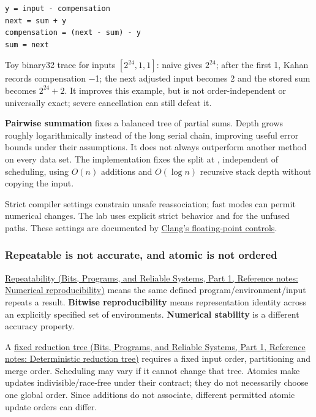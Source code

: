 \begin{verbatim}
y = input - compensation
next = sum + y
compensation = (next - sum) - y
sum = next
\end{verbatim}

Toy binary32 trace for inputs \([2^{24},1,1]\): naive gives \(2^{24}\); after the first 1, Kahan records compensation −1; the next adjusted input becomes 2 and the stored sum becomes \(2^{24}+2\). It improves this example, but is not order-independent or universally exact; severe cancellation can still defeat it.

\textbf{Pairwise summation} fixes a balanced tree of partial sums. Depth grows roughly logarithmically instead of the long serial chain, improving useful error bounds under their assumptions. It does not always outperform another method on every data set. The implementation fixes the split at , independent of scheduling, using \(O(n)\) additions and \(O(\log n)\) recursive stack depth without copying the input.

Strict compiler settings constrain unsafe reassociation; fast modes can permit numerical changes. The lab uses explicit strict behavior and  for the unfused paths. These settings are documented by \href{https://clang.llvm.org/docs/UsersManual.html\#controlling-floating-point-behavior}{Clang's floating-point controls}.

\subsubsection{Repeatable is not accurate, and atomic is not ordered}\label{05-engine-i-ch001-repeatable-is-not-accurate-and-atomic-is-not-ordered}

\hypertarget{05-engine-i-ch001-repeatable-is-not-accurate-and-atomic-is-not-ordered}{}

\href{../01-Bits-Programs-and-Reliable-Systems-P01/main.pdf\#nameddest=appendix-5f1a2c3f97ff}{Repeatability (Bits, Programs, and Reliable Systems, Part 1, Reference notes: Numerical reproducibility)} means the same defined program/environment/input repeats a result. \textbf{Bitwise reproducibility} means representation identity across an explicitly specified set of environments. \textbf{Numerical stability} is a different accuracy property.

A \href{../01-Bits-Programs-and-Reliable-Systems-P01/main.pdf\#nameddest=appendix-4c8e0238e7ee}{fixed reduction tree (Bits, Programs, and Reliable Systems, Part 1, Reference notes: Deterministic reduction tree)} requires a fixed input order, partitioning and merge order. Scheduling may vary if it cannot change that tree. Atomics make updates indivisible/race-free under their contract; they do not necessarily choose one global order. Since additions do not associate, different permitted atomic update orders can differ.

